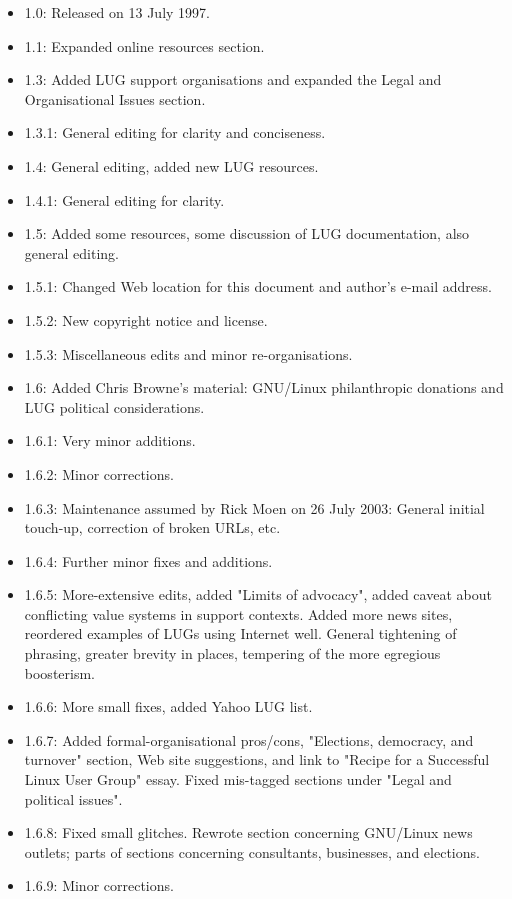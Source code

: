 \documentclass{HOWTO}
\begin{document}
\begin{itemize}
\item 1.0: Released on 13 July 1997.
\item 1.1: Expanded online resources section.
\item 1.3: Added LUG support organisations and expanded the Legal and Organisational Issues section.
\item 1.3.1: General editing for clarity and conciseness.
\item 1.4: General editing, added new LUG resources.
\item 1.4.1: General editing for clarity.
\item 1.5: Added some resources, some discussion of LUG documentation, also general editing.
\item 1.5.1: Changed Web location for this document and author's e-mail address.
\item 1.5.2: New copyright notice and license.
\item 1.5.3: Miscellaneous edits and minor re-organisations.
\item 1.6: Added Chris Browne's material: GNU/Linux philanthropic
donations and LUG political considerations.
\item 1.6.1: Very minor additions.
\item 1.6.2: Minor corrections.
\item 1.6.3: Maintenance assumed by Rick Moen on 26 July 2003:  General 
initial touch-up, correction of broken URLs, etc.
\item 1.6.4: Further minor fixes and additions.
\item 1.6.5: More-extensive edits, added "Limits of advocacy",
added caveat about conflicting value systems in support contexts.  Added
more news sites, reordered examples of LUGs using Internet well.  General 
tightening of phrasing, greater brevity in places, tempering of the more
egregious boosterism.
\item 1.6.6: More small fixes, added Yahoo LUG list.
\item 1.6.7: Added formal-organisational pros/cons, "Elections,
democracy, and turnover" section, Web site suggestions, and link
to "Recipe for a Successful Linux User Group" essay. Fixed mis-tagged 
sections under "Legal and political issues".
\item 1.6.8: Fixed small glitches.  Rewrote section concerning
GNU/Linux news outlets; parts of sections concerning consultants, businesses,
and elections.
\item 1.6.9: Minor corrections.

\end{itemize}
\end{document}
